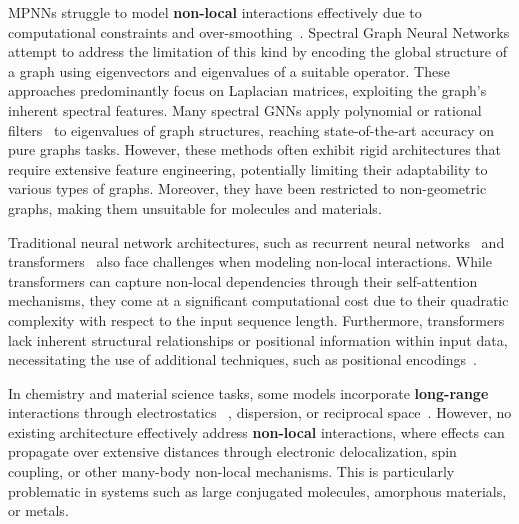 \documentclass{article} \usepackage{iclr2024_conference,times}
\begin{document}
MPNNs struggle to model {\bf non-local} interactions effectively due to computational constraints and over-smoothing~\citep{di2023over}. 
Spectral Graph Neural Networks attempt to address the limitation of this kind by encoding the global structure of a graph using eigenvectors and eigenvalues of a suitable operator. These approaches predominantly focus on Laplacian matrices, exploiting the graph's inherent spectral features. Many spectral GNNs apply polynomial or rational filters~\citep{bianchi2021graph, gasteiger2018predict, wang2022powerful, he2021bernnet, defferrard2016convolutional, zhu2021interpreting, kreuzer2021rethinking} to eigenvalues of graph structures, reaching state-of-the-art accuracy on pure graphs tasks. However, these methods often exhibit rigid architectures that require extensive feature engineering, 
potentially limiting their adaptability to various types of graphs. Moreover, they have been restricted to non-geometric graphs, making them unsuitable for molecules and materials.

Traditional neural network architectures, such as recurrent neural networks~\citep{elman1990finding,hochreiter1997long,cho2014properties,graves2013generating} and transformers~\citep{vaswani2017attention} also face challenges when modeling non-local interactions. While transformers can capture non-local dependencies through their self-attention mechanisms, they come at a significant computational cost due to their quadratic complexity with respect to the input sequence length. Furthermore, transformers lack inherent structural relationships or positional information within input data, necessitating the use of additional techniques, such as positional encodings~\citep{shaw2018selfattention}.  

In chemistry and material science tasks, some models incorporate {\bf long-range} interactions through electrostatics~ \citep{Grisafi2019LODE1, behler2021four_gen_rev, Unke2019PhysNet:Charges}, dispersion, or reciprocal space~\citep{gao2022self_consistent_nn, huguenindumittan2023physicsinspired, kosmala2023ewaldbased}. However, no existing architecture effectively address \textbf{non-local} interactions, where effects can propagate over extensive distances through electronic delocalization, spin coupling, or other many-body non-local mechanisms. This is particularly problematic in systems such as large conjugated molecules, amorphous materials, or metals. 
\end{document}
